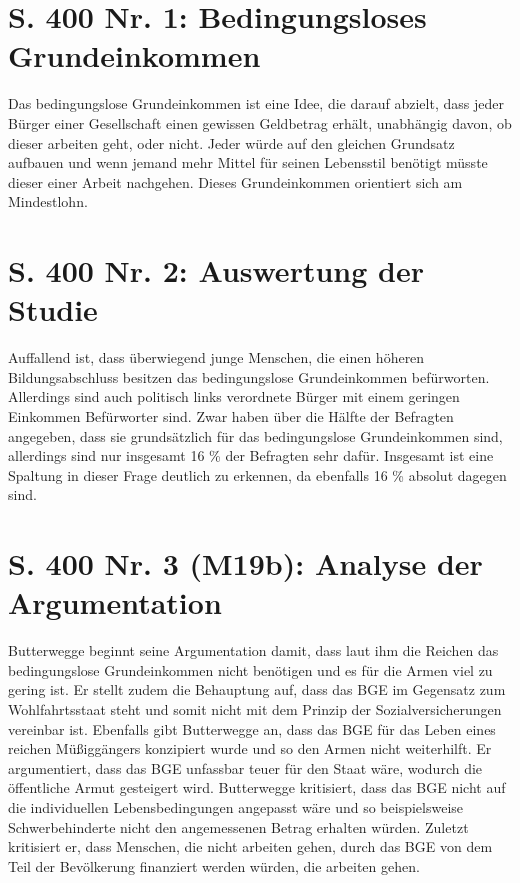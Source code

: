 \documentclass[a4paper, 12pt]{report}
\begin{document}
	\bsremovechaptertitle
	\noindent
	\chapter{S. 400 Nr. 1: Bedingungsloses Grundeinkommen}
	Das bedingungslose Grundeinkommen ist eine Idee, die darauf abzielt, dass jeder Bürger einer Gesellschaft einen gewissen Geldbetrag erhält, unabhängig davon, ob dieser arbeiten geht, oder nicht.
	Jeder würde auf den gleichen Grundsatz aufbauen und wenn jemand mehr Mittel für seinen Lebensstil benötigt müsste dieser einer Arbeit nachgehen.
	Dieses Grundeinkommen orientiert sich am Mindestlohn.
	
	\chapter{S. 400 Nr. 2: Auswertung der Studie}
	Auffallend ist, dass überwiegend junge Menschen, die einen höheren Bildungsabschluss besitzen das bedingungslose Grundeinkommen befürworten.
	Allerdings sind auch politisch links verordnete Bürger mit einem geringen Einkommen Befürworter sind.
	Zwar haben über die Hälfte der Befragten angegeben, dass sie grundsätzlich für das bedingungslose Grundeinkommen sind, allerdings sind nur insgesamt 16 \% der Befragten sehr dafür.
	Insgesamt ist eine Spaltung in dieser Frage deutlich zu erkennen, da ebenfalls 16 \% absolut dagegen sind.
	
	\chapter{S. 400 Nr. 3 (M19b): Analyse der Argumentation}
	Butterwegge beginnt seine Argumentation damit, dass laut ihm die Reichen das bedingungslose Grundeinkommen nicht benötigen und es für die Armen viel zu gering ist.
	Er stellt zudem die Behauptung auf, dass das BGE im Gegensatz zum Wohlfahrtsstaat steht und somit nicht mit dem Prinzip der Sozialversicherungen vereinbar ist.
	Ebenfalls gibt Butterwegge an, dass das BGE für das Leben eines reichen Müßiggängers konzipiert wurde und so den Armen nicht weiterhilft. 
	Er argumentiert, dass das BGE unfassbar teuer für den Staat wäre, wodurch die öffentliche Armut gesteigert wird.
	Butterwegge kritisiert, dass das BGE nicht auf die individuellen Lebensbedingungen angepasst wäre und so beispielsweise Schwerbehinderte nicht den angemessenen Betrag erhalten würden.
	 Zuletzt kritisiert er, dass Menschen, die nicht arbeiten gehen, durch das BGE von dem Teil der Bevölkerung finanziert werden würden, die arbeiten gehen. 
	
\end{document}
